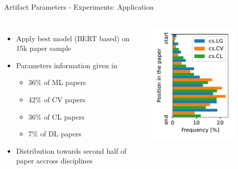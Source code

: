 \documentclass[en,16:9,smallfoot]{sdqbeamer}
\begin{document}
   \begin{frame}{Artifact Parameters - Experiments: Application}
   \begin{columns}
        \vspace{-1.5em}
        \begin{itemize}
        \item Apply best model (BERT based) on 15k paper sample
        \item Parameters information given in
        \begin{itemize}
            \item 36\% of ML papers
            \item 42\% of CV papers
            \item 36\% of CL papers
            \item 7\% of DL papers
        \end{itemize}
        \item Distribution towards second half of paper accross disciplines
        \end{itemize}
          \centering
           \includegraphics[width=0.75\textwidth]{imgs/hyperparam_pos}
   \end{columns}
   \end{frame}
\end{document}

